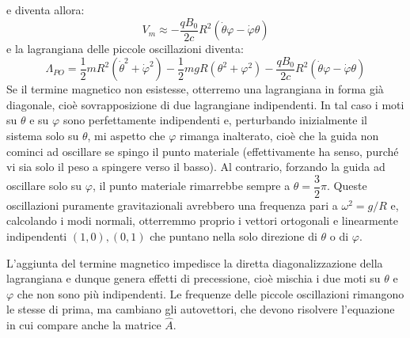 \documentclass[a4paper,openany]{article}
\begin{document}
	e diventa allora:
	\begin{equation}\label{key}
		V_{m} \approx  -\dfrac{qB_0}{2c}R^2(\dot{\theta}\varphi-\dot{\varphi}\theta)
	\end{equation}
	e la lagrangiana delle piccole oscillazioni diventa:
	\begin{equation}\label{key}
		\Lambda_{PO} = \dfrac{1}{2}mR^{2}(\dot{\theta}^{2}+\dot{\varphi}^{2}) - \dfrac{1}{2}mgR(\theta^{2}+\varphi^{2}) -\dfrac{qB_0}{2c}R^2(\dot{\theta}\varphi-\dot{\varphi}\theta)
	\end{equation}
	Se il termine magnetico non esistesse, otterremo una lagrangiana in forma già diagonale, cioè sovrapposizione di due lagrangiane indipendenti. In tal caso i moti su $\theta$ e su $\varphi$ sono perfettamente indipendenti e, perturbando inizialmente il sistema solo su $\theta$, mi aspetto che $\varphi$ rimanga inalterato, cioè che la guida non cominci ad oscillare se spingo il punto materiale (effettivamente ha senso, purché vi sia solo il peso a spingere verso il basso). Al contrario, forzando la guida ad oscillare solo su $\varphi$, il punto materiale rimarrebbe sempre a $\theta = \dfrac{3}{2}\pi$. Queste oscillazioni puramente gravitazionali avrebbero una frequenza pari a $\omega^2 = g/R$ e, calcolando i modi normali, otterremmo proprio i vettori ortogonali e linearmente indipendenti $(1,0), (0,1)$ che puntano nella solo direzione di $\theta$ o di $\varphi$.
	
	
	L'aggiunta del termine magnetico impedisce la diretta diagonalizzazione della lagrangiana e dunque genera effetti di precessione, cioè mischia i due moti su $\theta$ e $\varphi$ che non sono più indipendenti. Le frequenze delle piccole oscillazioni rimangono le stesse di prima, ma cambiano gli autovettori, che devono risolvere l'equazione in cui compare anche la matrice $\hat{A}$.
\end{document}
